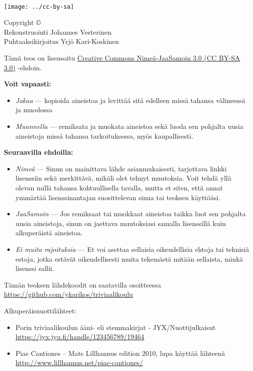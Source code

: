 \newpage
~\vfill
\thispagestyle{empty}
\setlength{\parindent}{0pt}
\setlength{\parskip}{\baselineskip}

\texttt{[image: ../cc-by-sa]}

Copyright \copyright\ \the\year \\
Rekonstruointi Johannes Vesterinen \\
Puhtaaksikirjoitus Yrjö Kari-Koskinen

Tämä teos on lisensoitu \href{https://creativecommons.org/licenses/by-sa/3.0/deed.fi}{Creative Commons Nimeä-JaaSamoin 3.0 (\textsc{CC BY-SA 3.0})} -ehdoin.

\textbf{Voit vapaasti:}
\begin{itemize}
	\item \emph{Jakaa} — kopioida aineistoa ja levittää sitä edelleen missä tahansa välineessä ja muodossa
	\item \emph{Muunnella} — remiksata ja muokata aineistoa sekä luoda sen pohjalta uusia aineistoja missä tahansa tarkoituksessa, myös kaupallisesti.
\end{itemize}

\textbf{Seuraavilla ehdoilla:}
\begin{itemize}

	\item \emph{Nimeä} — Sinun on mainittava lähde asianmukaisesti, tarjottava linkki lisenssiin sekä merkittävä, mikäli olet tehnyt muutoksia. Voit tehdä yllä olevan millä tahansa kohtuullisella tavalla, mutta et siten, että annat ymmärtää lisenssinantajan suosittelevan sinua tai teoksen käyttöäsi.

	\item \emph{JaaSamoin} — Jos remiksaat tai muokkaat aineistoa taikka luot sen pohjalta uusia aineistoja, sinun on jaettava muutoksiasi samalla lisenssillä kuin alkuperäistä aineistoa.

	\item \emph{Ei muita rajoituksia} — Et voi asettaa sellaisia oikeudellisia ehtoja tai teknisiä estoja, jotka estävät oikeudellisesti muita tekemästä mitään sellaista, minkä lisenssi sallii.
\end{itemize}

Tämän teoksen lähdekoodit on saatavilla osoitteessa \url{https://github.com/ykarikos/triviaalikoulu}

Alkuperäisnuottilähteet:
\begin{itemize}
\item Porin triviaalikoulun ääni- eli stemmakirjat - JYX/Nuottijulkaisut \\ \url{https://jyx.jyu.fi/handle/123456789/19464}
\item Piae Cantiones – Mats Lillhannus edition 2010, lupa käyttää lähteenä \\ \url{http://www.lillhannus.net/piae-cantiones/} 
\end{itemize}


